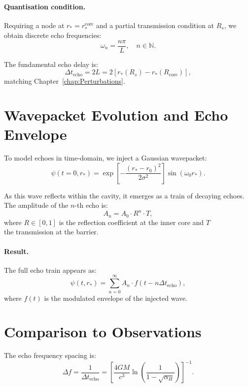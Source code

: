 \documentclass[a4paper, 12pt, oneside]{book}
\numberwithin{equation}{chapter}
\begin{document}
\paragraph{Quantisation condition.}
Requiring a node at \( r_* = r_*^{\text{core}} \) and a partial transmission condition at \( R_s \),  
we obtain discrete echo frequencies:
\[
    \omega_n = \frac{n\pi}{L},
    \quad n \in \mathbb{N}.
\]

The fundamental echo delay is:
\[
    \Delta t_{\text{echo}} = 2L = 2 \left[r_*(R_s) - r_*(R_{\text{core}})\right],
\]
matching Chapter~\ref{chap:Perturbations}.

\section[Wavepacket Evolution]{Wavepacket Evolution and Echo Envelope}
\label{sec:Wavepacket}

To model echoes in time-domain, we inject a Gaussian wavepacket:
\[
    \psi(t=0, r_*) = \exp\left[-\frac{(r_* - r_0)^2}{2\sigma^2}\right] \sin(\omega_0 r_*).
\]

As this wave reflects within the cavity, it emerges as a train of decaying echoes.  
The amplitude of the \( n \)-th echo is:
\[
    A_n = A_0 \cdot R^n \cdot T,
\]
where \( R \in [0,1] \) is the reflection coefficient at the inner core and \( T \) \\ the transmission at the barrier.

\paragraph{Result.}
The full echo train appears as:
\[
    \psi(t, r_*) = \sum_{n=0}^{\infty}
    A_n \cdot f(t - n \Delta t_{\text{echo}}),
\]
where \( f(t) \) is the modulated envelope of the injected wave.

\section{Comparison to Observations}
\label{sec:Observability}

The echo frequency spacing is:
\[
    \Delta f = \frac{1}{\Delta t_{\text{echo}}}
    = \left[\frac{4GM}{c^3} \ln\left(\frac{1}{1 - \sqrt{\alpha_H}}\right)\right]^{-1}.
\]
\end{document}
